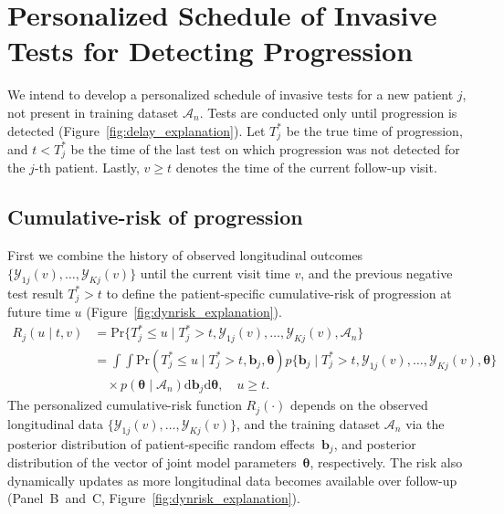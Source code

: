 \section{Personalized Schedule of Invasive Tests for Detecting Progression}
\label{sec:schedule}
We intend to develop a personalized schedule of invasive tests for a new patient $j$, not present in training dataset $\mathcal{A}_n$. Tests are conducted only until progression is detected (Figure~\ref{fig:delay_explanation}). Let $T^*_j$ be the true time of progression, and ${t < T^*_j}$ be the time of the last test on which progression was not detected for the $j$-th patient. Lastly, ${v \geq t}$ denotes the time of the current follow-up visit.

\subsection{Cumulative-risk of progression}
\label{subsec:cum_risk}
First we combine the history of observed longitudinal outcomes $\{\mathcal{Y}_{1j}(v), \ldots, \mathcal{Y}_{Kj}(v)\}$ until the current visit time $v$, and the previous negative test result ${T^*_j > t}$ to define the patient-specific cumulative-risk of progression at future time $u$ (Figure~\ref{fig:dynrisk_explanation}).
\begin{equation}
\label{eq:cumulative_risk}
\begin{split}
R_j(u \mid t, v) &= \mbox{Pr}\big\{T^*_j \leq u \mid T^*_j > t, \mathcal{Y}_{1j}(v), \ldots, \mathcal{Y}_{Kj}(v), \mathcal{A}_n\big\}\\
&=\int \int \mbox{Pr}(T^*_j \leq u \mid T^*_j > t, \boldsymbol{b}_{j}, \boldsymbol{\theta}) p\big\{\boldsymbol{b}_j \mid T^*_j > t, \mathcal{Y}_{1j}(v), \ldots, \mathcal{Y}_{Kj}(v), \boldsymbol{\theta} \big\}\\
&\quad \times p(\boldsymbol{\theta} \mid \mathcal{A}_n) \mathrm{d}\boldsymbol{b}_j \mathrm{d}\boldsymbol{\theta}, \quad u \geq t.
\end{split}
\end{equation}
The personalized cumulative-risk function $R_j(\cdot)$ depends on the observed longitudinal data $\{\mathcal{Y}_{1j}(v), \ldots, \mathcal{Y}_{Kj}(v)\}$, and the training dataset $\mathcal{A}_n$ via the posterior distribution of patient-specific random effects~$\boldsymbol{b}_j$, and posterior distribution of the vector of joint model parameters~$\boldsymbol{\theta}$, respectively. The risk also dynamically updates as more longitudinal data becomes available over follow-up (Panel~B~and~C, Figure~\ref{fig:dynrisk_explanation}).

